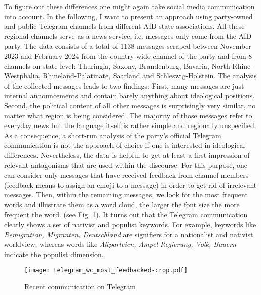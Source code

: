 \documentclass[a4paper]{scrreprt}
\begin{document}
To figure out these differences one might again take social media communication into account. In the following, I want to present an approach using party-owned and public Telegram channels from different AfD state associations. All these regional channels serve as a news service, i.e. messages only come from the AfD party. The data consists of a total of 1138 messages scraped between November 2023 and February 2024 from the country-wide channel of the party and from 8 channels on state-level: Thuringia, Saxony, Brandenburg, Bavaria, North Rhine-Westphalia, Rhineland-Palatinate, Saarland and Schleswig-Holstein. The analysis of the collected messages leads to two findings: First, many messages are just internal announcements and contain barely anything about ideological positions. Second, the political content of all other messages is surprisingly very similar, no matter what region is being considered. The majority of those messages refer to everyday news but the language itself is rather simple and regionally unspecified. As a consequence, a short-run analysis of the party's official Telegram communication is not the approach of choice if one is interested in ideological differences. Nevertheless, the data is helpful to get at least a first impression of relevant antagonisms that are used within the discourse. For this purpose, one can consider only messages that have received feedback from channel members (feedback means to assign an emoji to a message) in order to get rid of irrelevant messages. Then, within the remaining messages, we look for the most frequent words and illustrate them as a word cloud, the larger the font size the more frequent the word. (see Fig. \ref{fig:fig1}). It turns out that the Telegram communication clearly shows a set of nativist and populist keywords. For example, keywords like {\em Remigration, Migranten, Deutschland} are signifiers for a nationalist and nativist worldview, whereas words like {\em Altparteien, Ampel-Regierung, Volk, Bauern} indicate the populist dimension.\par
\begin{figure}[ht]
    \centering
    \texttt{[image: telegram\_wc\_most\_feedbacked-crop.pdf]}
    \caption{Recent communication on Telegram}
    \label{fig:fig1}
\end{figure}
\end{document}
